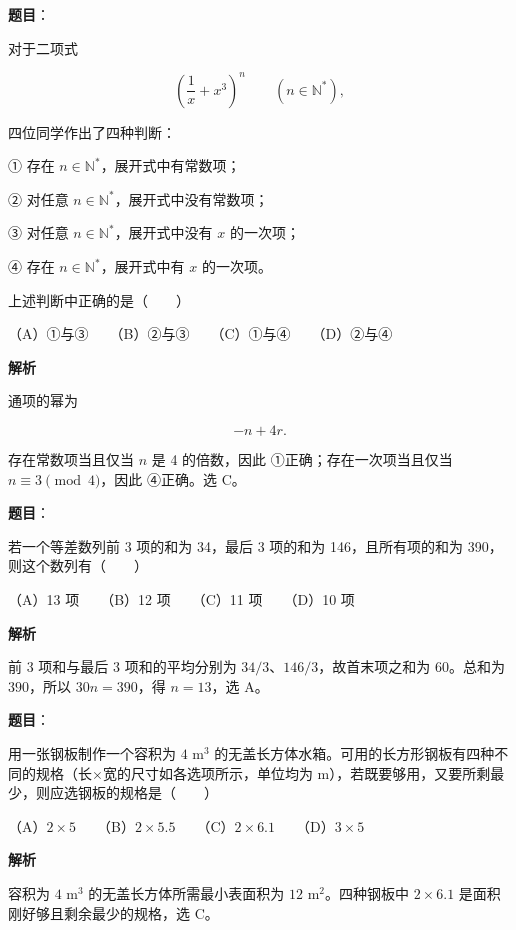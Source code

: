 \begin{answer}

\textbf{题目}：

对于二项式

\nopagebreak[4]
\[
\left(\frac1x+x^3\right)^n\qquad(n\in\mathbb N^*),
\]

四位同学作出了四种判断：

① 存在 $n\in\mathbb N^*$，展开式中有常数项；

② 对任意 $n\in\mathbb N^*$，展开式中没有常数项；

③ 对任意 $n\in\mathbb N^*$，展开式中没有 $x$ 的一次项；

④ 存在 $n\in\mathbb N^*$，展开式中有 $x$ 的一次项。

上述判断中正确的是\mbox{（　　）}

（A）①与③　　（B）②与③　　（C）①与④　　（D）②与④

\textbf{解析}

通项的幂为

\nopagebreak[4]
\[
-n+4r.
\]

存在常数项当且仅当 $n$ 是 4 的倍数，因此 ①正确；存在一次项当且仅当 $n\equiv3\pmod4$，因此 ④正确。选 C。


\end{answer}
\begin{answer}

\textbf{题目}：

若一个等差数列前 3 项的和为 34，最后 3 项的和为 146，且所有项的和为 390，则这个数列有\mbox{（　　）}

（A）13 项　　（B）12 项　　（C）11 项　　（D）10 项

\textbf{解析}

前 3 项和与最后 3 项和的平均分别为 $34/3$、$146/3$，故首末项之和为 $60$。总和为 $390$，所以 $30n=390$，得 $n=13$，选 A。


\end{answer}
\begin{answer}

\textbf{题目}：

用一张钢板制作一个容积为 $4\text{ m}^3$ 的无盖长方体水箱。可用的长方形钢板有四种不同的规格（长$\times$宽的尺寸如各选项所示，单位均为 m），若既要够用，又要所剩最少，则应选钢板的规格是\mbox{（　　）}

（A）$2\times5$　　（B）$2\times5.5$　　（C）$2\times6.1$　　（D）$3\times5$

\textbf{解析}

容积为 $4\text{ m}^3$ 的无盖长方体所需最小表面积为 $12\text{ m}^2$。四种钢板中 $2\times6.1$ 是面积刚好够且剩余最少的规格，选 C。


\end{answer}

